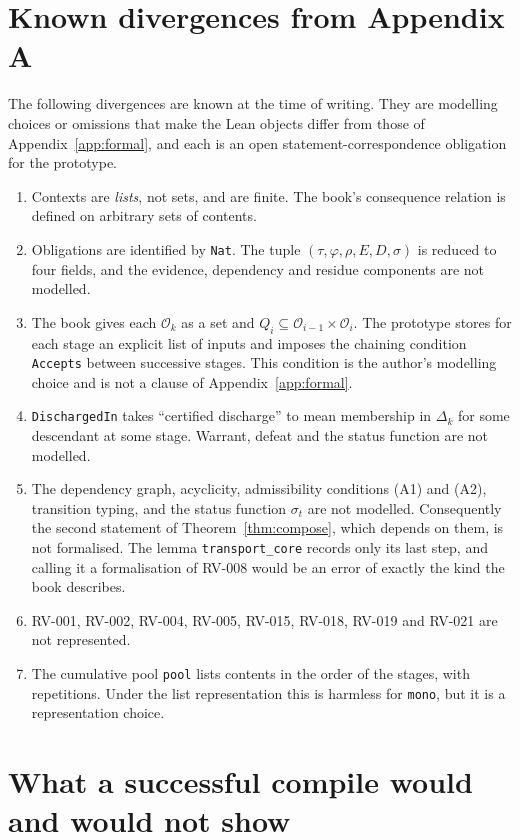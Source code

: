 \section{Known divergences from Appendix A}
\label{sec:leandiverge}

The following divergences are known at the time of writing. They are modelling choices or omissions that make the Lean objects differ from those of Appendix~\ref{app:formal}, and each is an open statement-correspondence obligation for the prototype.

\begin{enumerate}[label=(\roman*)]
\item Contexts are \emph{lists}, not sets, and are finite. The book's consequence relation is defined on arbitrary sets of contents.
\item Obligations are identified by \texttt{Nat}. The tuple $(\tau,\varphi,\rho,E,D,\sigma)$ is reduced to four fields, and the evidence, dependency and residue components are not modelled.
\item The book gives each $\mathcal{O}_k$ as a set and $Q_i\subseteq\mathcal{O}_{i-1}\times\mathcal{O}_i$. The prototype stores for each stage an explicit list of inputs and imposes the chaining condition \texttt{Accepts} between successive stages. This condition is the author's modelling choice and is not a clause of Appendix~\ref{app:formal}.
\item \texttt{DischargedIn} takes ``certified discharge'' to mean membership in $\Delta_k$ for some descendant at some stage. Warrant, defeat and the status function are not modelled.
\item The dependency graph, acyclicity, admissibility conditions (A1) and (A2), transition typing, and the status function $\sigma_t$ are not modelled. Consequently the second statement of Theorem~\ref{thm:compose}, which depends on them, is not formalised. The lemma \texttt{transport\_core} records only its last step, and calling it a formalisation of RV-008 would be an error of exactly the kind the book describes.
\item RV-001, RV-002, RV-004, RV-005, RV-015, RV-018, RV-019 and RV-021 are not represented.
\item The cumulative pool \texttt{pool} lists contents in the order of the stages, with repetitions. Under the list representation this is harmless for \texttt{mono}, but it is a representation choice.
\end{enumerate}

\section{What a successful compile would and would not show}

